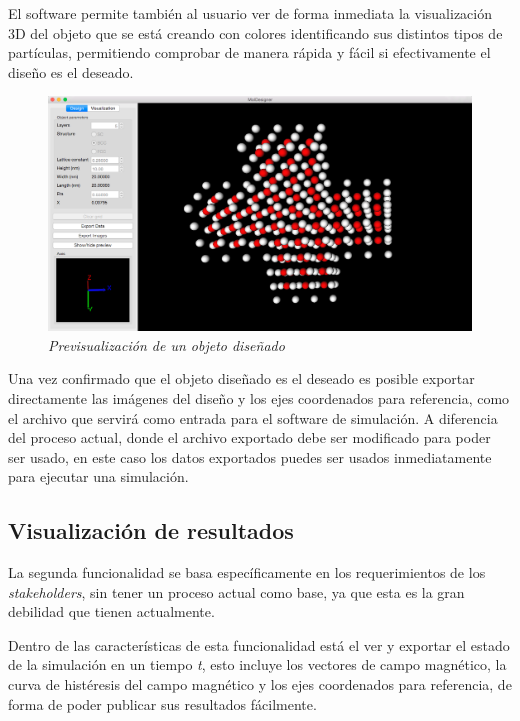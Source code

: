 El software permite también al usuario ver de forma inmediata la visualización 3D del objeto que se está creando con colores identificando sus distintos tipos de partículas, permitiendo comprobar de manera rápida y fácil si efectivamente el diseño es el deseado.

\begin{figure}[H]
  \centering
  \includegraphics[scale=.35]{images/softwareDisenoPrevisualizacion}
  \caption{\em Previsualización de un objeto diseñado}
\end{figure}

Una vez confirmado que el objeto diseñado es el deseado es posible exportar directamente las imágenes del diseño y los ejes coordenados para referencia, como el archivo que servirá como entrada para el software de simulación. A diferencia del proceso actual, donde el archivo exportado debe ser modificado para poder ser usado, en este caso los datos exportados puedes ser usados inmediatamente para ejecutar una simulación.

\subsection{Visualización de resultados}

La segunda funcionalidad se basa específicamente en los requerimientos de los \emph{stakeholders}, sin tener un proceso actual como base, ya que esta es la gran debilidad que tienen actualmente.

Dentro de las características de esta funcionalidad está el ver y exportar el estado de la simulación en un tiempo \emph{t}, esto incluye los vectores de campo magnético, la curva de histéresis del campo magnético y los ejes coordenados para referencia, de forma de poder publicar sus resultados fácilmente.


